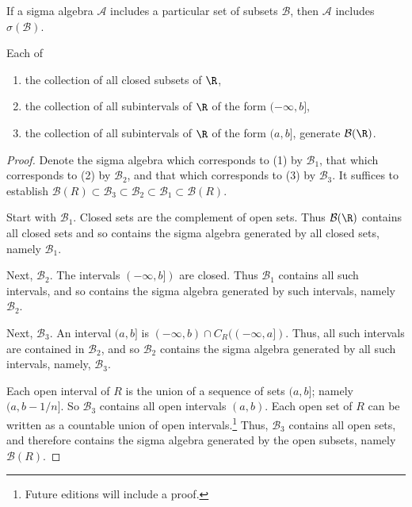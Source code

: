 \begin{proposition}
If a sigma algebra $\mathcal{A} $ includes a particular set of subsets $\mathcal{B} $, then $\mathcal{A} $ includes $\sigma (\mathcal{B} )$.\end{proposition}
\begin{proposition}

\label{borelalternategenerations}Each of
  \begin{enumerate}
    \item the collection of all closed subsets of $\R$,
    \item the collection of all subintervals of $\R$ of the form $(-\infty, b]$,
    \item the collection of all subintervals of $\R$ of the form $(a, b]$,
generate $\mathcal{B} (\R)$.
  \end{enumerate}\end{proposition}
\begin{proof}Denote the sigma algebra which corresponds to (1) by $\mathcal{B} _1$, that which corresponds to (2) by $\mathcal{B} _2$, and that which corresponds to (3) by $\mathcal{B} _3$.
It suffices to establish $\mathcal{B} (R) \subset \mathcal{B} _3 \subset \mathcal{B} _2 \subset \mathcal{B} _1 \subset \mathcal{B} (R)$.

Start with $\mathcal{B} _1$.
Closed sets are the complement of open sets.
Thus $\mathcal{B} (\R )$ contains all closed sets and so contains the sigma algebra generated by all closed sets, namely $\mathcal{B} _1$.

Next, $\mathcal{B} _2$.
The intervals $(-\infty, b])$ are closed.
Thus $\mathcal{B} _1$ contains all such intervals, and so contains the sigma algebra generated by such intervals, namely $\mathcal{B} _2$.

Next, $\mathcal{B} _3$.
An interval $(a, b]$ is $(-\infty, b) \cap  C_R((-\infty, a])$.
Thus, all such intervals are contained in $\mathcal{B} _2$, and so $\mathcal{B} _2$ contains the sigma algebra generated by all such intervals, namely, $\mathcal{B} _3$.

Each open interval of $R$ is the union of a sequence of sets $(a, b]$; namely $(a, b-1/n]$.
So $\mathcal{B} _3$ contains all open intervals $(a, b)$.
Each open set of $R$ can be written as a countable union of open intervals.\footnote{Future editions will include a proof.}
Thus, $\mathcal{B} _3$ contains all open sets, and therefore contains the sigma algebra generated by the open subsets, namely $\mathcal{B} (R)$.
\end{proof}
